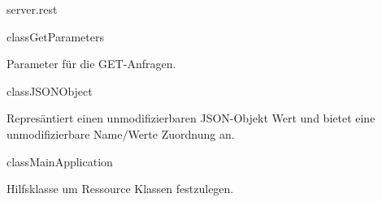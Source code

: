 \begin{texdocpackage}{server.rest}
\begin{texdocclass}{class}{GetParameters}
\label{texdoclet:edu.kit.informatik.studyplan.server.rest.GetParameters}
\begin{texdocclassintro}
Parameter für die GET-Anfragen.\end{texdocclassintro}
\begin{texdocclassconstructors}
\end{texdocclassconstructors}
\end{texdocclass}


\begin{texdocclass}{class}{JSONObject}
\label{texdoclet:edu.kit.informatik.studyplan.server.rest.JSONObject}
\begin{texdocclassintro}
Represäntiert einen unmodifizierbaren JSON-Objekt Wert und bietet eine unmodifizierbare Name$/$Werte Zuordnung an.\end{texdocclassintro}
\begin{texdocclassconstructors}
\end{texdocclassconstructors}
\end{texdocclass}


\begin{texdocclass}{class}{MainApplication}
\label{texdoclet:edu.kit.informatik.studyplan.server.rest.MainApplication}
\begin{texdocclassintro}
Hilfsklasse um Ressource Klassen festzulegen.\end{texdocclassintro}
\begin{texdocclassconstructors}
\end{texdocclassconstructors}
\end{texdocclass}



\end{texdocpackage}
